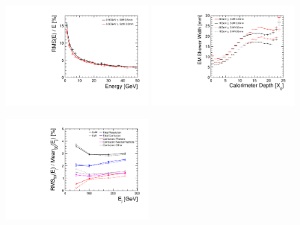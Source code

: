 \documentclass[final,3p,times,twocolumn]{elsarticle}
\begin{document}
\begin{figure}[!h]
  \begin{center}
     \includegraphics[width=0.49\textwidth]{ERes_vs_Egamma.pdf}
     \includegraphics[width=0.49\textwidth]{SiSc_TProfile.pdf}
     \caption{\label{}}
  \end{center}
\end{figure}

\begin{figure}[!h]
  \begin{center}
     \includegraphics[width=0.49\textwidth]{Confusion_vs_E.pdf}
     \caption{\label{}}
  \end{center}
\end{figure}
\end{document}
